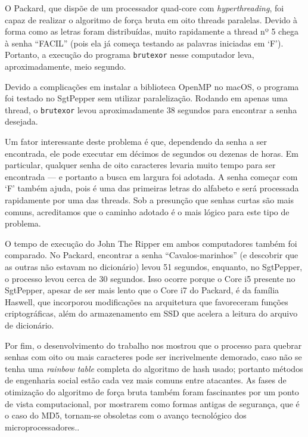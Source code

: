 \documentclass{sig-alternate-05-2015}
\begin{document}
O Packard, que dispõe de um processador quad-core com \textit{hyperthreading}, foi capaz de realizar o algoritmo de força bruta em oito threads paralelas.
Devido à forma como as letras foram distribuídas, muito rapidamente a thread nº 5 chega à senha ``FACIL'' (pois ela já começa testando as palavras iniciadas em `F').
Portanto, a execução do programa \texttt{brutexor} nesse computador leva, aproximadamente, meio segundo.

Devido a complicações em instalar a biblioteca OpenMP no macOS, o programa foi testado no SgtPepper sem utilizar paralelização.
Rodando em apenas uma thread, o \texttt{brutexor} levou aproximadamente 38 segundos para encontrar a senha desejada.

Um fator interessante deste problema é que, dependendo da senha a ser encontrada, ele pode executar em décimos de segundos ou dezenas de horas.
Em particular, qualquer senha de oito caracteres levaria muito tempo para ser encontrada — e portanto a busca em largura foi adotada.
A senha começar com `F' também ajuda, pois é uma das primeiras letras do alfabeto e será processada rapidamente por uma das threads.
Sob a presunção que senhas curtas são mais comuns, acreditamos que o caminho adotado é o mais lógico para este tipo de problema.

O tempo de execução do John The Ripper em ambos computadores também foi comparado.
No Packard, encontrar a senha ``Cavalos-marinhos'' (e descobrir que as outras não estavam no dicionário) levou 51 segundos, enquanto, no SgtPepper, o processo levou cerca de 30 segundos.
Isso ocorre porque o Core i5 presente no SgtPepper, apesar de ser mais lento que o Core i7 do Packard, é da família Haswell, que incorporou modificações na arquitetura que favoreceram funções criptográficas, além do armazenamento em SSD que acelera a leitura do arquivo de dicionário. 

Por fim, o desenvolvimento do trabalho nos mostrou que o processo para quebrar senhas com oito ou mais caracteres pode ser incrivelmente demorado, caso não se tenha uma \textit{rainbow table} completa do algoritmo de hash usado; portanto métodos de engenharia social estão cada vez mais comuns entre atacantes.
As fases de otimização do algoritmo de força bruta também foram fascinantes por um ponto de vista computacional, por mostrarem como formas antigas de segurança, que é o caso do MD5, tornam-se obsoletas com o avanço tecnológico dos microprocessadores..

%

%
%
\end{document}
